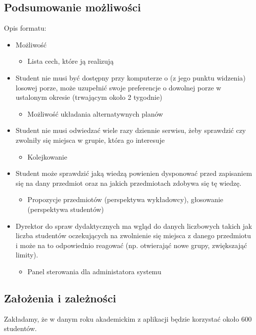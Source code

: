 \documentclass[11pt,leqno]{article}
\begin{document}
\subsection{Podsumowanie możliwości}
Opis formatu:
\begin{itemize}
\item Możliwość \\
\begin{itemize}
\item Lista cech, które ją realizują
\end{itemize}

\item Student nie musi być dostępny przy komputerze o (z jego punktu widzenia) losowej porze, może uzupełnić swoje preferencje o dowolnej porze w ustalonym okresie (trwającym około 2 tygodnie)
\begin{itemize}
\item Możliwość układania alternatywnych planów
\end{itemize}

\item Student nie musi odwiedzać wiele razy dziennie serwisu, żeby sprawdzić czy zwolniły się miejsca w grupie, która go interesuje
\begin{itemize}
\item Kolejkowanie
\end{itemize}

\item Student może sprawdzić jaką wiedzą powienien dysponować przed zapisaniem się na dany przedmiot oraz na jakich przedmiotach zdobywa się tę wiedzę.
\begin{itemize}
\item Propozycje przedmiotów (perspektywa wykładowcy), głosowanie (perspektywa studentów)
\end{itemize}

\item Dyrektor do spraw dydaktycznych ma wgląd do danych liczbowych takich jak liczba studentów oczekujących na zwolnienie się miejsca z danego przedmiotu i może na to odpowiednio reagować (np. otwierająć nowe grupy, zwiększająć limity).
\begin{itemize}
\item Panel sterowania dla administatora systemu
\end{itemize}
\end{itemize}

\subsection{Założenia i zależności}
Zakładamy, że w danym roku akademickim z aplikacji będzie korzystać około 600 studentów.
\end{document}
